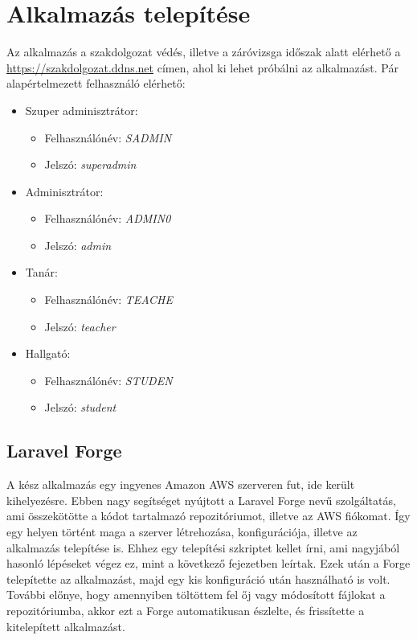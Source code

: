 \documentclass[
]{thesis-ekf}
\theoremstyle{definition}
\theoremstyle{remark}
\begin{document}
\chapter{Alkalmazás telepítése}
\label{setup}
Az alkalmazás a szakdolgozat védés, illetve a záróvizsga időszak alatt elérhető a \url{https://szakdolgozat.ddns.net} címen, ahol ki lehet próbálni az alkalmazást. Pár alapértelmezett felhasználó elérhető:
\begin{itemize}
	\item Szuper adminisztrátor:
	\begin{itemize}
		\item Felhasználónév: \emph{SADMIN}
		\item Jelszó: \emph{superadmin}
	\end{itemize}
	\item Adminisztrátor:
	\begin{itemize}
		\item Felhasználónév: \emph{ADMIN0}
		\item Jelszó: \emph{admin}
	\end{itemize}
	\item Tanár:
	\begin{itemize}
		\item Felhasználónév: \emph{TEACHE}
		\item Jelszó: \emph{teacher}
	\end{itemize}
	\item Hallgató:
	\begin{itemize}
		\item Felhasználónév: \emph{STUDEN}
		\item Jelszó: \emph{student}
	\end{itemize}
\end{itemize}
\section{Laravel Forge}

A kész alkalmazás egy ingyenes Amazon AWS\cite{aws} szerveren fut, ide került kihelyezésre. Ebben nagy segítséget nyújtott a Laravel Forge\cite{forge} nevű szolgáltatás, ami összekötötte a kódot tartalmazó repozitóriumot, illetve az AWS fiókomat. Így egy helyen történt maga a szerver létrehozása, konfigurációja, illetve az alkalmazás telepítése is. Ehhez egy telepítési szkriptet kellet írni, ami nagyjából hasonló lépéseket végez ez, mint a következő fejezetben leírtak. Ezek után a Forge telepítette az alkalmazást, majd egy kis konfiguráció után használható is volt. További előnye, hogy amennyiben töltöttem fel őj vagy módosított fájlokat a repozitóriumba, akkor ezt a Forge automatikusan észlelte, és frissítette a kitelepített alkalmazást.
\end{document}
